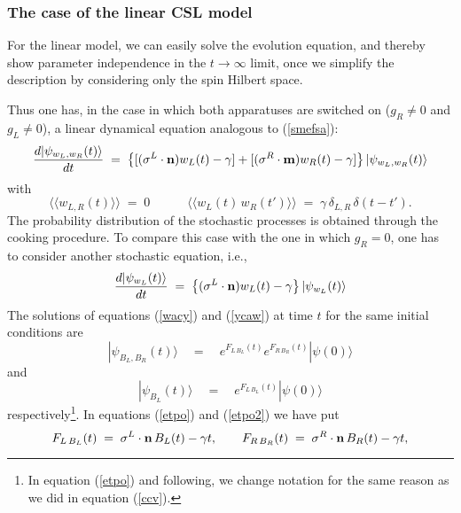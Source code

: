 \documentclass[12pt]{article}
\newcommand{\llangle}{\langle\!\langle}
\newcommand{\rrangle}{\rangle\!\rangle}
\begin{document}
\subsubsection{The case of the linear CSL model} \label{sec1132}

For the linear model, we can easily solve the evolution equation,
and thereby show parameter independence in the $t \rightarrow
\infty$ limit, once we simplify the description by considering
only the spin Hilbert space.

Thus one has, in the case in which both apparatuses are switched
on ($g_{R} \neq 0$ and $g_{L} \neq 0$), a linear dynamical
equation analogous to (\ref{smefsa}):
\begin{equation} \label{wacy}
\frac{d|\psi_{w_{L},w_{R}}(t)\rangle}{dt} \; = \; \left\{ [ ({\bf
\sigma}^{L}\cdot {\bf n})w_{L}(t) - \gamma] + [ ({\bf
\sigma}^{R}\cdot {\bf m})w_{R}(t) - \gamma] \right\}
|\psi_{w_{L},w_{R}}(t)\rangle
\end{equation}
with
\begin{equation}
\llangle w_{L,R}(t)\rrangle \; = \; 0 \qquad\quad \llangle
w_{L}(t)\, w_{R}(t')\rrangle \; = \; \gamma\, \delta_{L,R}\,
\delta(t - t').
\end{equation}
The probability distribution of the stochastic processes is
obtained through the cooking procedure. To compare this case with
the one in which $g_{R} = 0$, one has to consider another
stochastic equation, i.e.,
\begin{equation} \label{ycaw}
\frac{d|\psi_{w_{L}}(t)\rangle}{dt} \; = \; \left\{ ({\bf
\sigma}^{L}\cdot {\bf n})w_{L}(t) - \gamma  \right\}
|\psi_{w_{L}}(t)\rangle
\end{equation}
The solutions of equations (\ref{wacy}) and (\ref{ycaw}) at time
$t$ for the same initial conditions are
\begin{equation} \label{etpo}
|\psi_{B_{L}, B_{R}}(t)\rangle \quad = \quad e^{\displaystyle
F_{L\, B_{L}}(t)} e^{\displaystyle F_{R\, B_{R}}(t)}
|\psi(0)\rangle
\end{equation}
and
\begin{equation} \label{etpo2}
|\psi_{B_{L}}(t)\rangle \quad = \quad e^{\displaystyle F_{L\,
B_{L}}(t)} |\psi(0)\rangle
\end{equation}
respectively\footnote{In equation (\ref{etpo}) and following, we
change notation for the same reason as we did in equation
(\ref{ccv}).}. In equations (\ref{etpo}) and (\ref{etpo2}) we have
put
\begin{equation}
F_{L\, B_{L}}(t) \; = \; {\bf \sigma}^{L}\cdot{\bf n}\, B_{L}(t) -
\gamma t, \qquad F_{R\, B_{R}}(t) \; = \; {\bf
\sigma}^{R}\cdot{\bf n}\, B_{R}(t) - \gamma t,
\end{equation}
\end{document}

